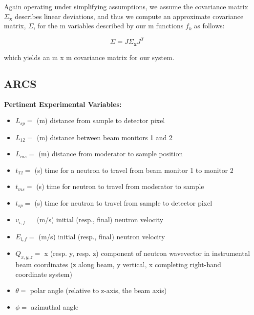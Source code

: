 \documentclass[aps,prl,twocolumn,groupedaddress]{revtex4-1}
\begin{document}
Again operating under simplifying assumptions, we assume the covariance matrix $\Sigma_{\mathbf{x}}$ describes linear deviations, and thus we compute an approximate covariance matrix, $\Sigma$, for the m variables described by our m functions $f_k$ as follows:

\begin{equation}
\Sigma = J \Sigma_{\mathbf{x}} J^T
\end{equation}

which yields an m x m covariance matrix for our system.

\subsection{ARCS}

\textbf{Pertinent Experimental Variables:}
\begin{itemize}
\item $L_{sp} = $ (m) distance from sample to detector pixel

\item $L_{12} = $ (m) distance between beam monitors 1 and 2

\item $L_{ms} = $ (m) distance from moderator to sample position

\item $t_{12} = $ (s) time for a neutron to travel from beam monitor 1 to monitor 2

\item $t_{ms} = $ (s) time for neutron to travel from moderator to sample

\item $t_{sp} = $ (s) time for neutron to travel from sample to detector pixel

\item $v_{i,f} = $ (m/s) initial (resp., final) neutron velocity

\item $E_{i,f} = $ (m/s) initial (resp., final) neutron velocity

\item $Q_{x,y,z} = $ x (resp. y, resp. z) component of neutron wavevector in instrumental beam coordinates (z along beam, y vertical, x completing right-hand coordinate system)

\item $\theta = $ polar angle (relative to z-axis, the beam axis)

\item $\phi = $ azimuthal angle

\end{itemize}
\end{document}
